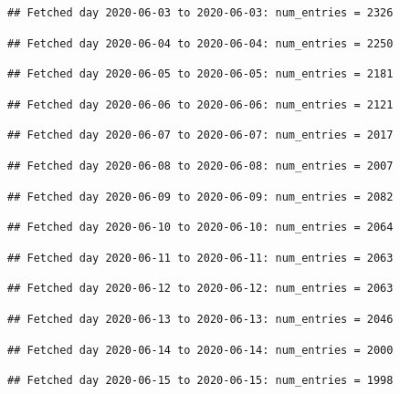 \documentclass[]{article}
\begin{document}
\begin{verbatim}
## Fetched day 2020-06-03 to 2020-06-03: num_entries = 2326
\end{verbatim}

\begin{verbatim}
## Fetched day 2020-06-04 to 2020-06-04: num_entries = 2250
\end{verbatim}

\begin{verbatim}
## Fetched day 2020-06-05 to 2020-06-05: num_entries = 2181
\end{verbatim}

\begin{verbatim}
## Fetched day 2020-06-06 to 2020-06-06: num_entries = 2121
\end{verbatim}

\begin{verbatim}
## Fetched day 2020-06-07 to 2020-06-07: num_entries = 2017
\end{verbatim}

\begin{verbatim}
## Fetched day 2020-06-08 to 2020-06-08: num_entries = 2007
\end{verbatim}

\begin{verbatim}
## Fetched day 2020-06-09 to 2020-06-09: num_entries = 2082
\end{verbatim}

\begin{verbatim}
## Fetched day 2020-06-10 to 2020-06-10: num_entries = 2064
\end{verbatim}

\begin{verbatim}
## Fetched day 2020-06-11 to 2020-06-11: num_entries = 2063
\end{verbatim}

\begin{verbatim}
## Fetched day 2020-06-12 to 2020-06-12: num_entries = 2063
\end{verbatim}

\begin{verbatim}
## Fetched day 2020-06-13 to 2020-06-13: num_entries = 2046
\end{verbatim}

\begin{verbatim}
## Fetched day 2020-06-14 to 2020-06-14: num_entries = 2000
\end{verbatim}

\begin{verbatim}
## Fetched day 2020-06-15 to 2020-06-15: num_entries = 1998
\end{verbatim}
\end{document}
